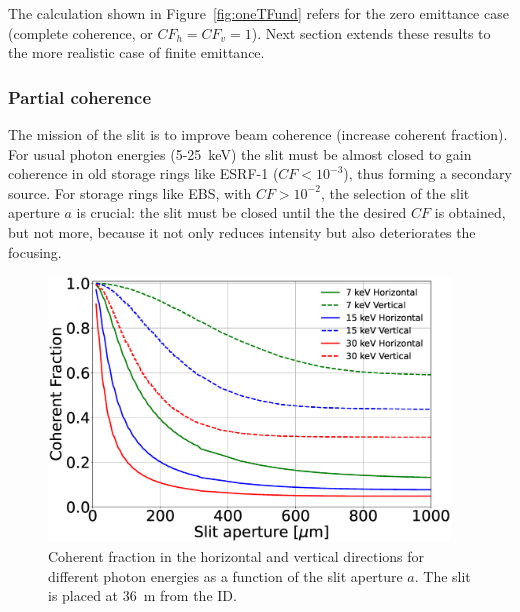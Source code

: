 \documentclass{iucr}              %
\begin{document}
The calculation shown in Figure~\ref{fig:oneTFund} refers for the zero emittance case (complete coherence, or $CF_h=CF_v=1$). Next section extends these results to the more realistic case of finite emittance.

\subsubsection{Partial coherence} The mission of the slit is to improve beam coherence (increase coherent fraction). For usual photon energies (5-25~keV)  the slit must be almost closed to gain coherence in old storage rings like ESRF-1 ($CF<10^{-3}$), thus forming a secondary source. For storage rings like EBS, with $CF > 10^{-2}$, the selection of the slit aperture $a$ is crucial: the slit must be closed until the the desired $CF$ is obtained, but not more, because it not only reduces intensity but also deteriorates the focusing. 

\begin{figure}
    \centering
    \includegraphics[width=0.95\textwidth]{figures/cf_vs_aperture.eps}

    \caption{
    Coherent fraction in the horizontal and vertical directions for different photon energies as a function of the slit aperture $a$. The slit is placed at \SI{36}{\meter} from the ID. 
    }
    \label{fig:cf_vs_aperture}
\end{figure}
\end{document}

